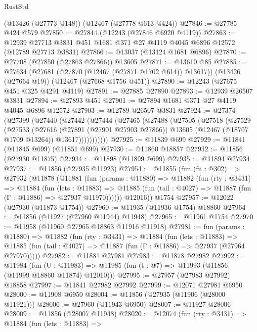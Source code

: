 \begin{lexlean}{RustStd}
\begin{coremodule}
    (@13426 (@27773 @148))
    (@12467 (@27778 @613 @424))
@27846 := @27785 @424 @579
@27850 := @27844 (@12243 (@27846 @6920 @4119))
@27863 := @12939 @27713 @3831 @451 @1681 @371 @27 @4119 @4045 @6896 @12572 (@12789 @27713 @3831)
@27866 := @13037 (@13124 @1681 @6896)
@27870 := @27708 (@27850 (@27863 @27866)) @13605
@27871 := @13610 @85
@27885 := @27634
    (@27681 (@27870 (@12467 (@27871 @1702 @614)) @13617))
    (@13426 (@27664 @19))
    (@12467 (@27668 @1756 @451))
@27890 := @12243 (@27675 @451 @325 @4291 @4119)
@27891 := @27885 @27890
@27893 := @12939 @26507 @3831
@27894 := @27893 @451
@27901 := @27894 @1681 @371 @27 @4119 @4045 @6896 @12572
@27903 := @12789 @26507 @3831
@27924 := @27374
    (@27399
      (@27440
        (@27442
          (@27444
            (@27465
              (@27488
                (@27505
                  (@27518
                    (@27529
                      (@27533
                        (@27616
                          (@27891 (@27901 @27903 @27866))
                          @13605
                          (@12467 (@18707 @1709 @13264))
                          @13617)))))))))))
@27925 := @11839 @699
@27929 := @11841 (@11845 @699) (@11851 @699)
@27930 := @11860 @18857
@27932 := @11856 (@27930 @11875)
@27934 := @11898 (@11899 @699)
@27935 := @11894 @27934
@27937 := @11856 (@27935 @11923)
@27954 := @11855
    (fun (fn : @302) =>
    @27932
      (@11878
        (@11881
          (fun (params : @11880) =>
          @11882
            (fun (rty : @3431) =>
            @11884
              (fun (lets : @11883) =>
              @11885 (fun (tail : @4027) => @11887 (fun (Γ : @11886) => @27937 @11970))))))
        @12016))
    @1754
@27957 := @12022 (@27930 (@11873 @1754))
@27960 := @11935 (@11936 @1754) @18860
@27964 := @11856 (@11927 (@27960 @11944) @11948)
@27965 := @11961 @1754
@27970 := @11958 (@11960 @27965 @18863 @11916 @11918)
@27981 := fun (params : @11880) =>
  @11882
    (fun (rty : @3431) =>
    @11884
      (fun (lets : @11883) =>
      @11885 (fun (tail : @4027) => @11887 (fun (Γ : @11886) => @27937 (@27964 @27970)))))
@27982 := @11881 @27981
@27983 := @11878 @27982
@27992 := @11984
    (fun (U : @11983) => @11985 (fun (t : @7) => @11993 (@11856 (@11999 @18860 @11874) @12010)))
@27995 := @27957 (@27983 @27992) @18858
@27997 := @11841 @27982 @27992
@27999 := @12071 @27981 @6950
@28000 := @11908 @6950
@28004 := @11856 (@27935 (@11906 (@28000 @11921)))
@28006 := @27960 (@11943 @6950)
@28007 := @11927 @28006
@28009 := @11856 (@28007 @11948)
@28020 := @12074
    (fun (rty : @3431) =>
    @11884
      (fun (lets : @11883) =>

\end{coremodule}
\end{lexlean}
